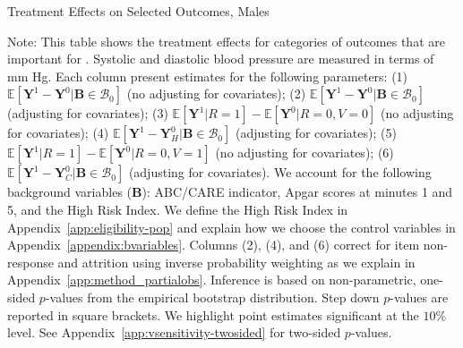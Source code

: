 \begin{table}
\centering
\begin{threeparttable}
\caption{Treatment Effects on Selected Outcomes, Males}\label{table:tescombinedmales}
\begin{scriptsize}

\end{scriptsize}
\begin{tablenotes}
\scriptsize
Note: This table shows the treatment effects for categories of outcomes that are important for \citet{Garcia_Heckman_Leaf_etal_2017_Comp_CBA_Unpublished}. Systolic and diastolic blood pressure are measured in terms of mm Hg. Each column present estimates for the following parameters: (1) $\mathbb{E} \left [ \bm{Y}^1 -  \bm{Y}^0 | \bm{B} \in \mathcal{B}_{0} \right]$ (no adjusting for covariates); (2) $\mathbb{E} \left [ \bm{Y}^1 -  \bm{Y}^0 | \bm{B} \in \mathcal{B}_{0} \right]$ (adjusting for covariates); (3) $\mathbb{E} \left [ \bm{Y}^1 | R = 1 \right] -  \mathbb{E} \left [ \bm{Y}^0 | R = 0,V = 0  \right]$ (no adjusting for covariates); (4) $\mathbb{E} \left [ \bm{Y}^1 -  \bm{Y}_H^0 | \bm{B} \in \mathcal{B}_{0} \right]$ (adjusting for covariates); (5) $\mathbb{E} \left [ \bm{Y}^1 | R = 1 \right] -  \mathbb{E} \left [ \bm{Y}^0 | R = 0,V = 1 \right]$ (no adjusting for covariates); (6) $\mathbb{E} \left [ \bm{Y}^1 -  \bm{Y}_C^0 | \bm{B} \in \mathcal{B}_{0} \right]$ (adjusting for covariates). We account for the following background variables ($\bm{B}$): ABC/CARE indicator, Apgar scores at minutes 1 and 5, and the High Risk Index. We define the High Risk Index in Appendix~\ref{app:eligibility-pop} and explain how we choose the control variables in Appendix~\ref{appendix:bvariables}. Columns (2), (4), and (6) correct for item non-response and attrition using inverse probability weighting as we explain in Appendix~\ref{app:method_partialobs}. Inference is based on non-parametric, one-sided $p$-values from the empirical bootstrap distribution. Step down $p$-values are reported in square brackets. We highlight point estimates significant at the $10\%$ level. See Appendix~\ref{app:vsensitivity-twosided} for two-sided $p$-values.\\
\end{tablenotes}
\end{threeparttable}
\end{table}
\doublespacing

